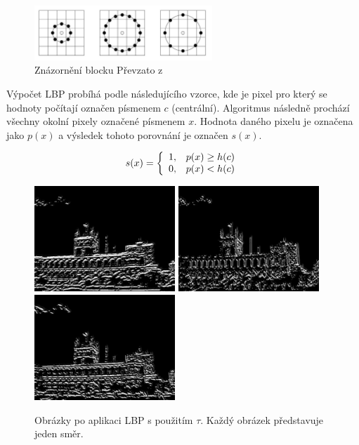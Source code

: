 \documentclass[czech,BP]{thesiskiv}
\begin{document}
\begin{figure}[H]
		\centering
		\includegraphics[width=253px]{./img/znazorneni_lbp.png}	
		\caption{Znázornění blocku Převzato z \cite{SrovnaniDeskriptoru}}
\end{figure}

\par Výpočet LBP probíhá podle následujícího vzorce, kde je pixel pro který se hodnoty počítají označen písmenem $c$ (centrální). Algoritmus následně prochází všechny okolní pixely označené písmenem  $x$. Hodnota daného pixelu je označena jako $p(x)$ a výsledek tohoto porovnání je označen $s(x)$.

\begin{displaymath} 
	\label{asd2} 
		    s(x) = \left\{ \begin{array}{r@{\quad}c}
    		1, & p(x) \geq h(c) \\
    		0, & p(x) < h(c) \\ \end{array} \right. 
\end{displaymath}

\begin{figure}[ht]
	\centering
	\includegraphics[width=150pt]{./img/lbp1_tau.jpg}
	\includegraphics[width=150pt]{./img/lbp2_tau.jpg}
	\includegraphics[width=150pt]{./img/lbp3_tau.jpg}
	\caption{Obrázky po aplikaci LBP s použitím $\tau$. Každý obrázek představuje jeden směr.}
\end{figure}
\end{document}
